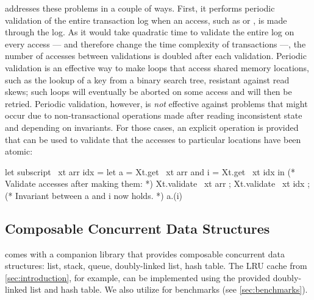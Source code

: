 \Kcas addresses these problems in a couple of ways.
First, it performs periodic validation of the entire transaction log when an access, such as  or , is made through the log.
As it would take quadratic time to validate the entire log on every access --- and therefore change the time complexity of transactions ---, the number of accesses between validations is doubled after each validation.
Periodic validation is an effective way to make loops that access shared memory locations, such as the lookup of a key from a binary search tree, resistant against read skews; such loops will eventually be aborted on some access and will then be retried.
Periodic validation, however, is \emph{not} effective against problems that might occur due to non-transactional operations made after reading inconsistent state and depending on invariants.
For those cases, an explicit  operation is provided that can be used to validate that the accesses to particular locations have been atomic:
\begin{ocamlcode}
let subscript ~xt arr idx =
  let a = Xt.get ~xt arr and i = Xt.get ~xt idx in
  (* Validate accesses after making them: *)
  Xt.validate ~xt arr ; Xt.validate ~xt idx ;
  (* Invariant between a and i now holds. *)
  a.(i)
\end{ocamlcode}

\subsection{Composable Concurrent Data Structures}

\Kcas comes with a companion library \KcasData that provides composable concurrent data structures: list, stack, queue, doubly-linked list, hash table.
The LRU cache from \cref{sec:introduction}, for example, can be implemented using the provided doubly-linked list and hash table.
We also utilize \KcasData for benchmarks (see \cref{sec:benchmarks}).
